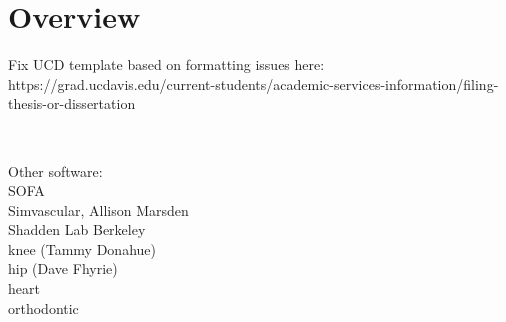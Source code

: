 \chapter{Overview}
%

Fix UCD template based on formatting issues here: https://grad.ucdavis.edu/current-students/academic-services-information/filing-thesis-or-dissertation

~\cite{heartmech}~\cite{newheartpaper}~\cite{vorocrust1,vorocrust2,simpleware,persson}

Other software:\\
SOFA\\
Simvascular, Allison Marsden\\
Shadden Lab Berkeley\\
knee (Tammy Donahue) \\
hip (Dave Fhyrie) \\
heart \\
orthodontic \\